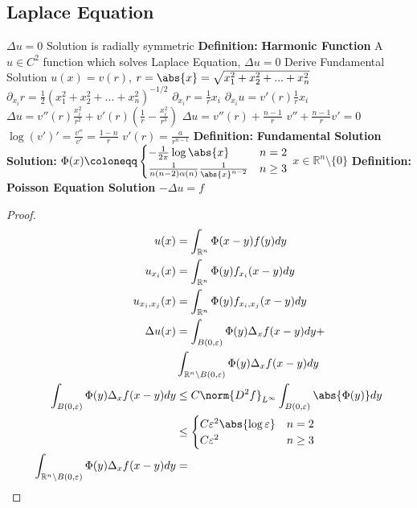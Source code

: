 \documentclass[14pt]{extarticle}
\def\Definition{{\color{blue} \textbf{Definition:} }}
\def\Solution{{\color{cyan} \textbf{Solution:} }}
\begin{document}
\begin{outline}
	\section*{Laplace Equation}
		\1	$\Delta u = 0$
			\2	Solution is radially symmetric
		\1	\Definition \textbf{Harmonic Function}
			\2	A $u \in C^2$ function which solves Laplace Equation, $\Delta u = 0$
		\1	Derive Fundamental Solution
			\2	$u(x) = v(r)$, $r = \abs{x} = \sqrt{x_1^2 + x_2^2 + ... + x_n^2}$
			\2	$\partial_{x_i} r = \frac{1}{2}(x_1^2 + x_2^2 + ... + x_n^2)^{-1/2}$
				\3	$\partial_{x_i} r = \frac{1}{r}x_i$
				\3	$\partial_{x_i} u = v'(r) \frac{1}{r}x_i$
				\3	$\Delta u = v''(r) \frac{x_i^2}{r^2} + v'(r)(\frac{1}{r} - \frac{x_i^2}{r^3})$
			\2	$\Delta u = v''(r) + \frac{n-1}{r}$
				\3	$v'' + \frac{n-1}{r}v' = 0$
				\3	$\log(v')' = \frac{v''}{v'} = \frac{1-n}{r}$
				\3	$v'(r) = \frac{a}{r^{n-1}}$
		\1	\Definition \textbf{Fundamental Solution}
			\2	\Solution $\Phi(x) \coloneqq \begin{cases}
						-\frac{1}{2\pi}	\log \abs{x} & n = 2 \\
						\frac{1}{n(n-2)\alpha(n)}\frac{1}{\abs{x}^{n-2}} & n \ge 3 \\
					\end{cases}$
				\3	$x \in \mathbb{R}^n \setminus \{0\}$
		\1	\Definition \textbf{Poisson Equation Solution}
			\2	$-\Delta u = f$
			\2	\begin{proof}
						\begin{align*}
						u(x) &= \int_{\mathbb{R}^n} \Phi(x-y)f(y)dy \\
						u_{x_i}(x) &= \int_{\mathbb{R}^n} \Phi(y) f_{x_i}(x-y) dy \\
						u_{x_i,x_j}(x) &= \int_{\mathbb{R}^n} \Phi(y) f_{x_i,x_j}(x-y)dy \\
						\Delta u(x) &= \int_{B(0,\varepsilon)} \Phi(y)\Delta_xf(x-y)dy + \\
						&\int_{\mathbb{R}^n \setminus B(0,\varepsilon)} \Phi(y)\Delta_xf(x-y) dy \\
						\int_{B(0,\varepsilon)} \Phi(y)\Delta_xf(x-y)dy &\le
						C\norm{D^2f}_{L^{\infty}} \int_{B(0,\varepsilon)} \abs{\Phi(y)}dy \\
						&\le \begin{cases}
										C\varepsilon^2 \abs{\log \varepsilon} & n = 2 \\
										C \varepsilon^2 & n \ge 3
								 \end{cases}\\
\int_{\mathbb{R}^n \setminus B(0,\varepsilon)} \Phi(y)\Delta_xf(x-y) dy &=

\end{align*}
\end{proof}
\end{outline}
\end{document}
